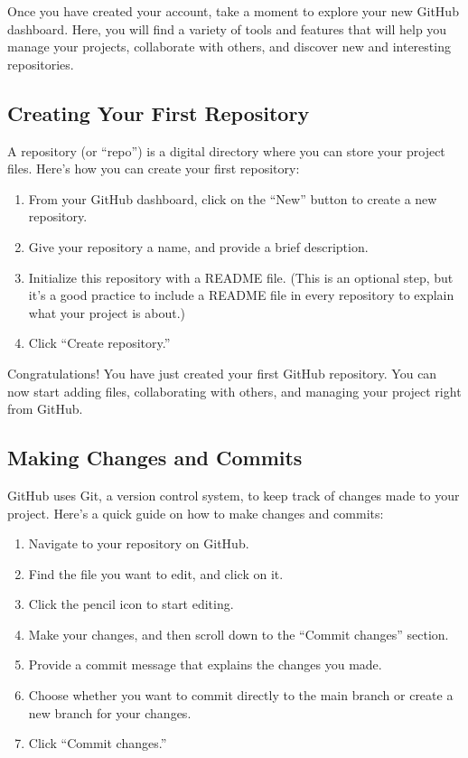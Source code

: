 \documentclass[a4paper,12pt]{book}
\begin{document}
Once you have created your account, take a moment to explore your new GitHub dashboard. Here, you will find a variety of tools and features that will help you manage your projects, collaborate with others, and discover new and interesting repositories.

\subsection*{Creating Your First Repository}

A repository (or “repo”) is a digital directory where you can store your project files. Here’s how you can create your first repository:

\begin{enumerate}
    \item From your GitHub dashboard, click on the “New” button to create a new repository.
    \item Give your repository a name, and provide a brief description.
    \item Initialize this repository with a README file. (This is an optional step, but it’s a good practice to include a README file in every repository to explain what your project is about.)
    \item Click “Create repository.”
\end{enumerate}

Congratulations! You have just created your first GitHub repository. You can now start adding files, collaborating with others, and managing your project right from GitHub.

\subsection*{Making Changes and Commits}

GitHub uses Git, a version control system, to keep track of changes made to your project. Here’s a quick guide on how to make changes and commits:

\begin{enumerate}
    \item Navigate to your repository on GitHub.
    \item Find the file you want to edit, and click on it.
    \item Click the pencil icon to start editing.
    \item Make your changes, and then scroll down to the “Commit changes” section.
    \item Provide a commit message that explains the changes you made.
    \item Choose whether you want to commit directly to the main branch or create a new branch for your changes.
    \item Click “Commit changes.”
\end{enumerate}
\end{document}
